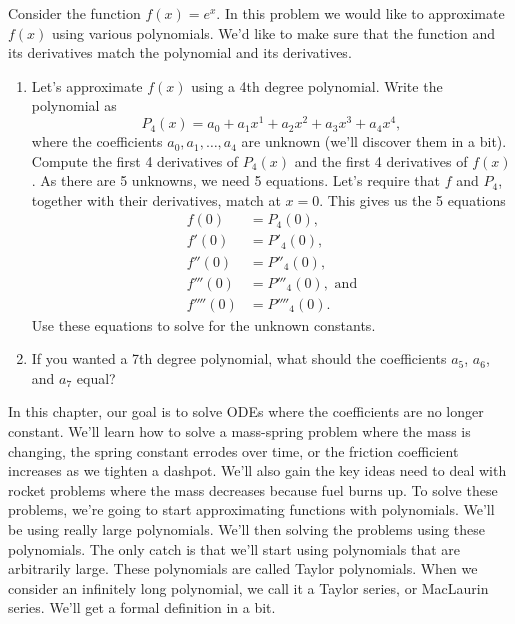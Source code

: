 \begin{problem}
 Consider the function $f(x) = e^x$. In this problem we would like to approximate $f(x)$ using various polynomials. We'd like to make sure that the function and its derivatives match the polynomial and its derivatives.
\begin{enumerate}
 \item Let's approximate $f(x)$ using a 4th degree polynomial.  Write the polynomial as 
$$P_4(x) = a_0+a_1x^1+a_2x^2+a_3x^3+a_4x^4,$$
 where the coefficients $a_0,a_1,\ldots, a_4$ are unknown (we'll discover them in a bit). 
 Compute the first 4 derivatives of $P_4(x)$ and the first 4 derivatives of $f(x)$. As there are 5 unknowns, we need 5 equations. Let's require that $f$ and $P_4$, together with their derivatives, match at $x=0$. This gives us the 5 equations 
\begin{align*}
f(0)&=P_4(0),\\
f'(0)&=P'_4(0),\\
f''(0)&=P''_4(0),\\
f'''(0)&=P'''_4(0), \text{ and}\\
f''''(0)&=P''''_4(0).
\end{align*}
Use these equations to solve for the unknown constants.
\item If you wanted a 7th degree polynomial, what should the coefficients $a_5$, $a_6$, and $a_7$ equal?
\end{enumerate}

\end{problem}

In this chapter, our goal is to solve ODEs where the coefficients are no longer constant. We'll learn how to solve a mass-spring problem where the mass is changing, the spring constant errodes over time, or the friction coefficient increases as we tighten a dashpot.  We'll also gain the key ideas need to deal with rocket problems where the mass decreases because fuel burns up.  To solve these problems, we're going to start approximating functions with polynomials. We'll be using really large polynomials. We'll then solving the problems using these polynomials.  The only catch is that we'll start using polynomials that are arbitrarily large.  These polynomials are called Taylor polynomials.  When we consider an infinitely long polynomial, we call it a Taylor series, or MacLaurin series.  We'll get a formal definition in a bit.

